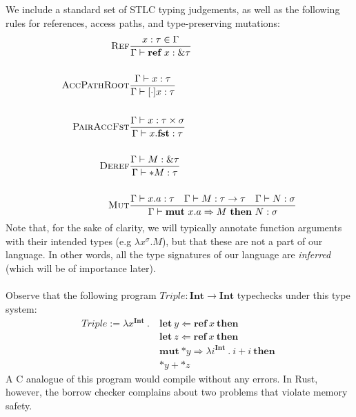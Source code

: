 \documentclass{article}
\newcommand{\mkref}{\textbf{ref}~}
\newcommand{\mutate}[3]{\textbf{mut}~ #1 \Rightarrow #2 ~\textbf{then}~ #3}
\newcommand{\drfPth}{\mathbf{*}}
\newcommand{\letvar}[3]{\textbf{let}~ #1 \Leftarrow #2 ~\textbf{then}~ #3}
\newcommand{\judge}[3]{\textsc{#1}&\frac{#2}{#3}}
\begin{document}
We include a standard set of STLC typing judgements, as well as the following rules for references, access paths, and type-preserving mutations:
\begin{align*}
    \judge{Ref}{x : \tau \in \Gamma}{\Gamma \vdash \mkref x : \& \tau}\\
    ~\\
    \judge{AccPathRoot}{\Gamma \vdash x : \tau}{\Gamma \vdash [\cdot]x : \tau}\\
    ~\\
    \judge{PairAccFst}{\Gamma \vdash x : \tau \times \sigma}{\Gamma \vdash x.\textbf{fst} : \tau}\\
    ~\\
    \judge{Deref}{\Gamma \vdash M : \& \tau}{\Gamma \vdash \drfPth M : \tau}\\
    ~\\
    \judge{Mut}{ \Gamma \vdash x.a : \tau \hspace{1em} \Gamma \vdash M : \tau \rightarrow \tau \hspace{1em} \Gamma \vdash N : \sigma }{\Gamma \vdash \mutate{x.a}{M}{N} : \sigma }
\end{align*}
Note that, for the sake of clarity, we will typically annotate function arguments with their intended types (e.g $\lambda x^\sigma . M$), but that these are not a part of our language. In other words, all the type signatures of our language are \textit{inferred} (which will be of importance later).
\\~\\
Observe that the following program $Triple : \textbf{Int} \rightarrow \textbf{Int}$ typechecks under this type system:
\begin{align*}
    Triple := \lambda x^{\textbf{Int}} ~.~ &\letvar{y}{\mkref x}{}\\  %
    &\letvar{z}{\mkref x}{}\\
    & \mutate{\drfPth y}{ \lambda i^{\textbf{Int}} ~.~ i + i }{} \\
    &\drfPth y + \drfPth z
\end{align*}
A C analogue of this program would compile without any errors. In Rust, however, the borrow checker complains about two problems that violate memory safety. 
\end{document}

